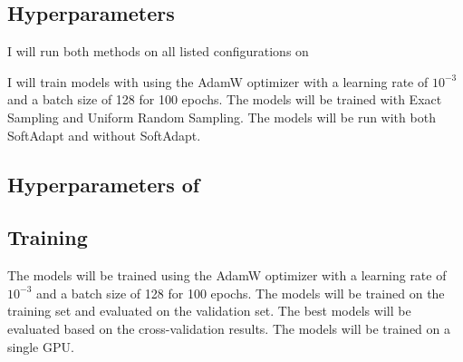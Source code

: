 \subsection{Hyperparameters}

I will run both methods on all listed configurations on 

I will train models with  using the AdamW optimizer with a learning rate of $10^{-3}$ and a batch size of 128 for 100 epochs. The models will be trained with Exact Sampling and Uniform Random Sampling. The models will be run with both SoftAdapt and without SoftAdapt. 
\subsection{Hyperparameters of }




\subsection{Training}

The models will be trained using the AdamW optimizer with a learning rate of $10^{-3}$ and a batch size of 128 for 100 epochs. The models will be trained on the training set and evaluated on the validation set. The best models will be evaluated based on the cross-validation results. The models will be trained on a single GPU.